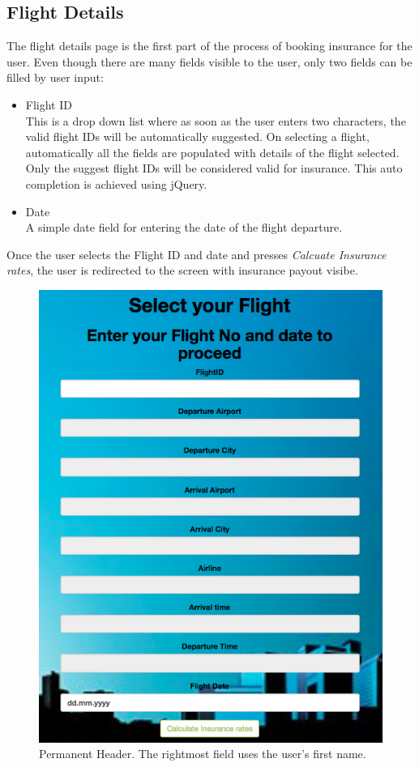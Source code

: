 \subsection{Flight Details}
The flight details page is the first part of the process of booking insurance for the user. Even though there are many fields visible to the user, only two fields can be filled by user input:
\begin{itemize}
    \item Flight ID
    \\This is a drop down list where as soon as the user enters two characters, the valid flight IDs will be automatically suggested.  On selecting a flight, automatically all the fields are populated with details of the flight selected. Only the suggest flight IDs will be considered valid for insurance. This auto completion is achieved using jQuery.
    \item Date
    \\ A simple date field for entering the date of the flight departure.
\end{itemize}
Once the user selects the Flight ID and date and presses \textit{Calcuate Insurance rates}, the user is redirected to the screen with insurance payout visibe.

\begin{figure}[h]
    \centering
    \includegraphics[width=\textwidth]{Figures/flight_details.png}
    \caption{Permanent Header. The rightmost field uses the user's first name.}
    \label{fig:flight_details}
\end{figure}

